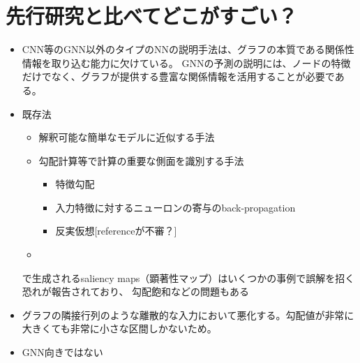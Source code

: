 \documentclass[a4paper,10pt]{ltjsarticle}
\newcommand{\1}{\mbox{1}\hspace{-0.25em}\mbox{l}}
\theoremstyle{definition}
\begin{document}
    \section{先行研究と比べてどこがすごい？}
    \begin{itemize}
        \item CNN等のGNN以外のタイプのNNの説明手法は、グラフの本質である関係性情報を取り込む能力に欠けている。
        GNNの予測の説明には、ノードの特徴だけでなく、グラフが提供する豊富な関係情報を活用することが必要である。
        \item 既存法
        \begin{itemize}
            \item 解釈可能な簡単なモデルに近似する手法\cite{ribeiro2016should, augasta2012reverse, lakkaraju2017interpretable, zilke2016deepred}
            \item 勾配計算等で計算の重要な側面を識別する手法
            \begin{itemize}
                \item 特徴勾配\cite{erhan2009visualizing, zeiler2014visualizing}
                \item 入力特徴に対するニューロンの寄与のback-propagation\cite{chen2018learning, shrikumar2017learning, sundararajan2017axiomatic}
                \item 反実仮想[referenceが不審？]
            \end{itemize}
            \item
        \end{itemize}
        で生成されるsaliency maps（顕著性マップ）\cite{zeiler2014visualizing}はいくつかの事例で誤解を招く恐れが報告されており\cite{adebayo2018sanity}、
        勾配飽和などの問題もある\cite{shrikumar2017learning, sundararajan2017axiomatic}
        \item グラフの隣接行列のような離散的な入力において悪化する。勾配値が非常に大きくても非常に小さな区間しかないため。
        \item GNN向きではない
    \end{itemize}
\end{document}
